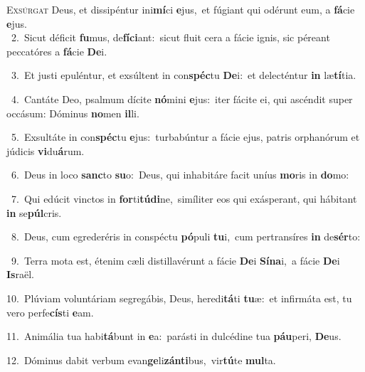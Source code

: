 \lettrine{\initial\textcolor{\initialcolor}{E}}{xsúrgat} Deus, et dissipéntur ini\-\textbf{mí}\-ci \textbf{e}\-jus,~\star et fúgiant qui odérunt eum, a \textbf{fá}\-cie \textbf{e}\-jus.\\
{\numbfont\textcolor{\numbcolor}{~2.}}~Sicut déficit \textbf{fu}\-mus, de\-\textbf{fí}\-\textbf{ci}ant:~\star sicut fluit cera a fácie ignis, sic péreant peccatóres a \textbf{fá}\-cie \textbf{De}\-i.\par
{\numbfont\textcolor{\numbcolor}{~3.}}~Et justi epuléntur, et exsúltent in con\-\textbf{spéc}\-tu \textbf{De}\-i:~\star et delecténtur \textbf{in} læ\-\textbf{tí}\-tia.\par
{\numbfont\textcolor{\numbcolor}{~4.}}~Cantáte Deo, psalmum dícite \textbf{nó}\-mini \textbf{e}\-jus:~\star iter fácite ei, qui ascéndit super occásum: Dóminus \textbf{no}\-men \textbf{il}\-li.\par
{\numbfont\textcolor{\numbcolor}{~5.}}~Exsultáte in con\-\textbf{spéc}\-tu \textbf{e}\-jus:~\star turbabúntur a fácie ejus, patris orphanórum et júdicis \textbf{vi}\-du\-\textbf{á}\-rum.\par
{\numbfont\textcolor{\numbcolor}{~6.}}~Deus in loco \textbf{sanc}\-to \textbf{su}\-o:~\star Deus, qui inhabitáre facit uníus \textbf{mo}\-ris in \textbf{do}\-mo:\par
{\numbfont\textcolor{\numbcolor}{~7.}}~Qui edúcit vinctos in \textbf{for}\-ti\-\textbf{tú}\-\textbf{di}ne,~\star simíliter eos qui exásperant, qui hábitant \textbf{in} se\-\textbf{púl}\-cris.\par
{\numbfont\textcolor{\numbcolor}{~8.}}~Deus, cum egrederéris in conspéctu \textbf{pó}\-puli \textbf{tu}\-i,~\star cum pertransíres \textbf{in} de\-\textbf{sér}\-to:\par
{\numbfont\textcolor{\numbcolor}{~9.}}~Terra mota est, étenim cæli distillavérunt a fácie \textbf{De}\-i \textbf{Sí}\-\textbf{na}i,~\star a fácie \textbf{De}\-i \textbf{Is}\-raël.\par
{\numbfont\textcolor{\numbcolor}{10.}}~Plúviam voluntáriam segregábis, Deus, heredi\-\textbf{tá}\-ti \textbf{tu}\-æ:~\star et infirmáta est, tu vero perfe\-\textbf{cís}\-ti \textbf{e}\-am.\par
{\numbfont\textcolor{\numbcolor}{11.}}~Animália tua habi\-\textbf{tá}\-bunt in \textbf{e}\-a:~\star parásti in dulcédine tua \textbf{páu}\-peri, \textbf{De}\-us.\par
{\numbfont\textcolor{\numbcolor}{12.}}~Dóminus dabit verbum evan\-\textbf{ge}\-li\-\textbf{zán}\-\textbf{ti}bus,~\star vir\-\textbf{tú}\-te \textbf{mul}\-ta.\par
